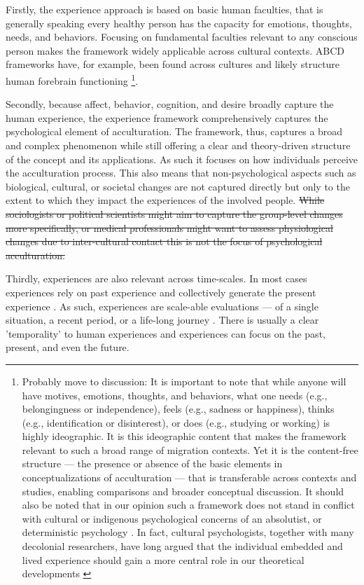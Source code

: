 \documentclass[man, 12pt, a4paper]{apa7}
\begin{document}
Firstly, the experience approach is based on basic human faculties, that is generally speaking every healthy person has the capacity for emotions, thoughts, needs, and behaviors. Focusing on fundamental faculties relevant to any conscious person makes the framework widely applicable across cultural contexts. ABCD frameworks have, for example, been found across cultures \citep[e.g.,][]{Bhawuk2011} and likely structure human forebrain functioning \citep{Swanson2020}\footnote{Probably move to discussion: It is important to note that while anyone will have motives, emotions, thoughts, and behaviors, what one needs (e.g., belongingness or independence), feels (e.g., sadness or happiness), thinks (e.g., identification or disinterest), or does (e.g., studying or working) is highly ideographic. It is this ideographic content that makes the framework relevant to such a broad range of migration contexts. Yet it is the content-free structure --- the presence or absence of the basic elements in conceptualizations of acculturation --- that is transferable across contexts and studies, enabling comparisons and broader conceptual discussion. It should also be noted that in our opinion such a framework does not stand in conflict with cultural or indigenous psychological concerns of an absolutist, or deterministic psychology \citep[e.g.,][]{Kim2006a}. In fact, cultural psychologists, together with many decolonial researchers, have long argued that the individual embedded and lived experience should gain a more central role in our theoretical developments \citep[e.g., ontological turn;][]{Pedersen2020}}.

Secondly, because affect, behavior, cognition, and desire broadly capture the human experience, the experience framework comprehensively captures the psychological element of acculturation. The framework, thus, captures a broad and complex phenomenon while still offering a clear and theory-driven structure of the concept and its applications. 
As such it focuses on how individuals perceive the acculturation process. This also means that non-psychological aspects such as biological, cultural, or societal changes are not captured directly but only to the extent to which they impact the experiences of the involved people. \sout{While sociologists or political scientists might aim to capture the group-level changes more specifically, or medical professionals might want to assess physiological changes due to inter-cultural contact this is not the focus of psychological acculturation.} 

Thirdly, experiences are also relevant across time-scales. In most cases experiences rely on past experience and collectively generate the present experience \citep[also see][]{Husserl1959, Heidegger1867}. As such, experiences are scale-able evaluations --- of a single situation, a recent period, or a life-long journey \citep[e.g.,][]{Clewett2019}. There is usually a clear 'temporality' to human experiences and experiences can focus on the past, present, and even the future.
\end{document}
